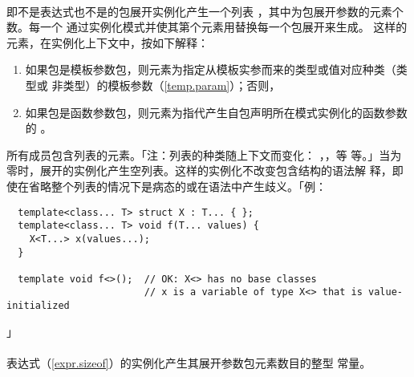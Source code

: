 \paragraph{}
即不是表达式也不是的包展开实例化产生一个列表
，其中为包展开参数的元素个数。每一个
通过实例化模式并使其第个元素用替换每一个包展开来生成。
这样的元素，在实例化上下文中，按如下解释：
\begin{enumerate}
  \item{如果包是模板参数包，则元素为指定从模板实参而来的类型或值对应种类（类型或
    非类型）的模板参数（\ref{temp.param}）；否则，}
  \item{如果包是函数参数包，则元素为指代产生自包声明所在模式实例化的函数参数的
    。}
\end{enumerate}
所有成员包含列表的元素。「注：列表的种类随上下文而变化：
，，等
等。」当为零时，展开的实例化产生空列表。这样的实例化不改变包含结构的语法解
释，即使在省略整个列表的情况下是病态的或在语法中产生歧义。「例：
\begin{lstlisting}
  template<class... T> struct X : T... { };
  template<class... T> void f(T... values) {
    X<T...> x(values...);
  }

  template void f<>();  // OK: X<> has no base classes
                        // x is a variable of type X<> that is value-initialized
\end{lstlisting}」

\paragraph{}
表达式（\ref{expr.sizeof}）的实例化产生其展开参数包元素数目的整型
常量。

